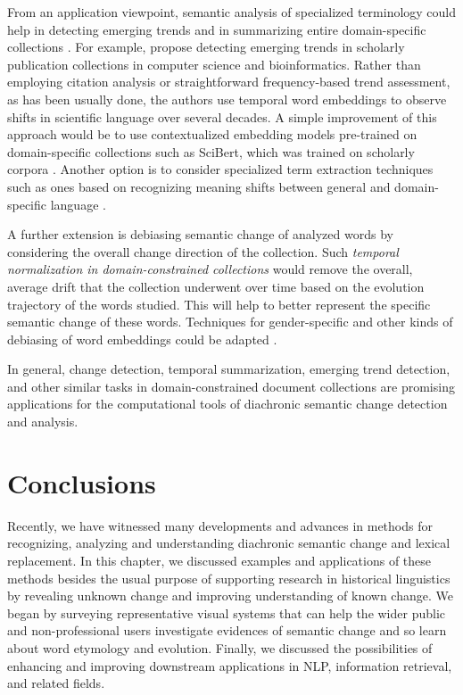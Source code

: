 \documentclass[output=paper]{langsci/langscibook}
\begin{document}
From an application viewpoint, semantic analysis of specialized terminology could help in detecting emerging trends \citep{dridi2019leap2trend} and in summarizing entire domain-specific collections \citep{syafiq}.
For example, \citet{dridi2019leap2trend} propose detecting emerging trends in scholarly publication collections in  computer science and bioinformatics. Rather than employing citation analysis or straightforward frequency-based trend assessment, as  has been usually done, the authors use temporal word embeddings to observe shifts in scientific language over several decades. A simple improvement of this approach would be to use contextualized embedding models pre-trained on domain-specific collections such as SciBert, which was trained on scholarly corpora \citep{beltagy2019scibert}. Another option is to consider specialized term extraction techniques such as ones based on recognizing meaning shifts between general and domain-specific language \citep{hatty2019surel}. 

A further extension is debiasing semantic change of analyzed words by considering the overall change direction of the collection. Such \emph{temporal normalization in domain-constrained collections} would remove the overall, average drift that the collection underwent over time based on the evolution trajectory of the words studied. This will help to better represent the specific semantic change of these words. Techniques for gender-specific and other kinds of debiasing of word embeddings could be adapted \citep{bolukbasi2016man, kaneko2019gender}. 

\begin{sloppypar}
In general, change detection, temporal summarization, emerging trend detection, and other similar tasks in  domain-constrained document collections are promising applications for the computational tools of diachronic semantic change detection and analysis.
\end{sloppypar}


\section{Conclusions}
Recently, we have witnessed many developments and advances in methods for recognizing, analyzing and understanding diachronic semantic change and lexical replacement. In this chapter, we discussed examples and applications of these methods besides the usual purpose of supporting research in historical linguistics by revealing unknown change and improving understanding of known change. 
We began by surveying representative visual systems that can help the wider public and non-professional users investigate evidences of semantic change and so  learn about word etymology and evolution. Finally, we discussed the possibilities of enhancing and improving downstream applications in NLP, information retrieval, and related fields.
\end{document}

